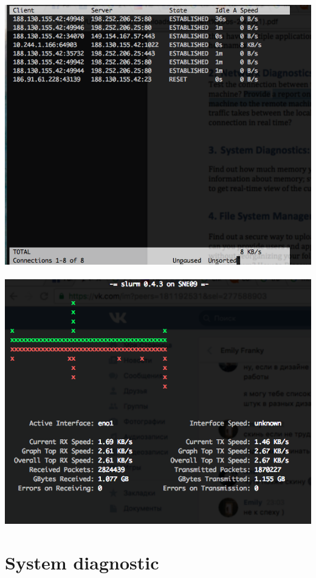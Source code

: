 \documentclass[10pt]{article}
\begin{document}
\includegraphics[width=\textwidth]{tcptrack} \\ \\
\includegraphics[width=\textwidth]{slurm} 

\section{System diagnostic}
\end{document}
